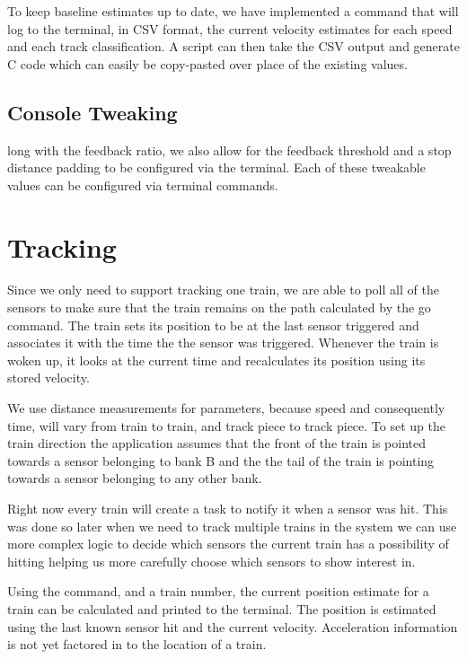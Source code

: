 \documentclass[pdftex,10pt,a4paper]{article}
\begin{document}
To keep baseline estimates up to date, we have implemented a 
command that will log to the terminal, in CSV format, the current
velocity estimates for each speed and each track classification. A script
can then take the CSV output and generate C code which can easily be
copy-pasted over place of the existing values.

\subsection*{Console Tweaking}

long with the feedback ratio, we also allow for the feedback threshold
and a stop distance padding to be configured via the terminal. Each of
these tweakable values can be configured via terminal commands.

\section*{Tracking}

Since we only need to support tracking one train, we are able to poll
all of the sensors to make sure that the train remains on the path
calculated by the go command. The train sets its position to be at the
last sensor triggered and associates it with the time the the sensor was
triggered. Whenever the train is woken up, it looks at the
current time and recalculates its position using its stored velocity.

We use distance measurements for parameters, because speed and
consequently time, will vary from train to train, and track piece to
track piece. To set up the train direction the application assumes that
the front of the train is pointed towards a sensor belonging to bank B
and the the tail of the train is pointing towards a sensor belonging to
any other bank.

Right now every train will create a task to notify it when a sensor was hit.
This was done so later when we need to track multiple trains in the system we
can use more complex logic to decide which sensors the current train has a
possibility of hitting helping us more carefully choose which sensors to show
interest in.

Using the  command, and a train number, the current position
estimate for a train can be calculated and printed to the terminal. The
position is estimated using the last known sensor hit and the current
velocity. Acceleration information is not yet factored in to the
location of a train.
\end{document}
